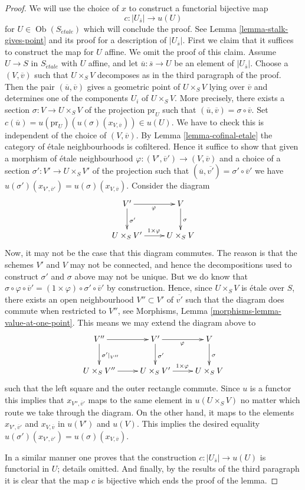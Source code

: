 \documentclass[10pt,a4paper]{amsart}
\theoremstyle{plain}
\theoremstyle{definition}
\theoremstyle{remark}
\numberwithin{equation}{subsection}
\def\Ob{\mathop{\mathrm{Ob}}\nolimits}
\def\etale{{\acute{e}tale}}
\begin{document}
\begin{proof}
\medskip\noindent
We will use the choice of $x$ to construct a functorial bijective map
$$
c : |U_{\overline{s}}| \longrightarrow u(U)
$$
for $U \in \Ob(S_\etale)$ which will conclude the proof. See
Lemma \ref{lemma-stalk-gives-point}
and its proof for a description of $|U_{\overline{s}}|$.
First we claim that it suffices to construct the map for $U$ affine.
We omit the proof of this claim.
Assume $U \to S$ in $S_\etale$ with $U$ affine, and let
$\overline{u} : \overline{s} \to U$ be an element of $|U_{\overline{s}}|$.
Choose a $(V, \overline{v})$ such that $U \times_S V$ decomposes
as in the third paragraph of the proof.
Then the pair $(\overline{u}, \overline{v})$ gives a geometric point of
$U \times_S V$ lying over $\overline{v}$ and determines one of the
components $U_i$ of $U \times_S V$. More precisely, there exists
a section $\sigma : V \to U \times_S V$ of the projection $\text{pr}_U$
such that $(\overline{u}, \overline{v}) = \sigma \circ \overline{v}$. Set
$c(\overline{u}) = u(\text{pr}_U)(u(\sigma)(x_{V, \overline{v}})) \in u(U)$.
We have to check this is independent of the choice of $(V, \overline{v})$. By
Lemma \ref{lemma-cofinal-etale}
the category of \'etale neighbourhoods is cofiltered.
Hence it suffice to show
that given a morphism of \'etale neighbourhood
$\varphi : (V', \overline{v}') \to (V, \overline{v})$ and a choice of a
section $\sigma' : V' \to U \times_S V'$ of the projection such that
$(\overline{u}, \overline{v'}) = \sigma' \circ \overline{v}'$
we have $u(\sigma')(x_{V', \overline{v}'}) = u(\sigma)(x_{V, \overline{v}})$.
Consider the diagram
$$
\xymatrix{
V' \ar[d]^{\sigma'} \ar[r]_\varphi & V \ar[d]^\sigma \\
U \times_S V' \ar[r]^{1 \times \varphi} &
U \times_S V
}
$$
Now, it may not be the case that this diagram commutes. The reason is
that the schemes $V'$ and $V$ may not be connected, and hence
the decompositions used to construct $\sigma'$ and $\sigma$ above may
not be unique. But we do know that
$\sigma \circ \varphi \circ \overline{v}' =
(1 \times \varphi) \circ \sigma' \circ \overline{v}'$
by construction. Hence, since $U \times_S V$ is \'etale over $S$,
there exists an open neighbourhood
$V'' \subset V'$ of $\overline{v'}$ such that the diagram does
commute when restricted to $V''$, see
Morphisms, Lemma \ref{morphisms-lemma-value-at-one-point}.
This means we may extend the diagram above to
$$
\xymatrix{
V'' \ar[r] \ar[d]^{\sigma'|_{V''}} &
V' \ar[d]^{\sigma'} \ar[r]_\varphi &
V \ar[d]^\sigma \\
U \times_S V'' \ar[r] &
U \times_S V' \ar[r]^{1 \times \varphi} &
U \times_S V
}
$$
such that the left square and the outer rectangle commute.
Since $u$ is a functor this implies that
$x_{V'', \overline{v}'}$ maps to the same element in
$u(U \times_S V)$ no matter which route we take through the
diagram. On the other hand, it maps to the elements
$x_{V', \overline{v}'}$ and $x_{V, \overline{v}}$ in
$u(V')$ and $u(V)$. This implies the desired equality
$u(\sigma')(x_{V', \overline{v}'}) = u(\sigma)(x_{V, \overline{v}})$.

\medskip\noindent
In a similar manner one proves that the construction
$c : |U_{\overline{s}}| \to u(U)$ is functorial in $U$;
details omitted. And finally, by the results of the
third paragraph it is clear that the map $c$ is bijective
which ends the proof of the lemma.
\end{proof}
\end{document}
